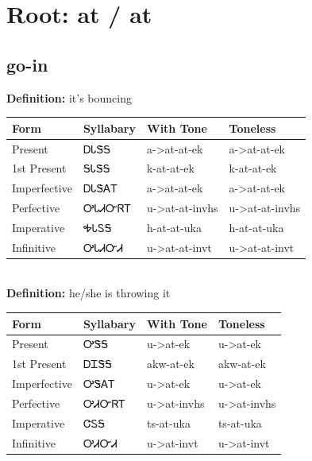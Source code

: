 \documentclass{article}%
\begin{document}
%
\normalsize%
\section*{Root: at / at}%
\subsection*{go-in}%
\textbf{Definition: }%
it’s bouncing%
\\[0.5em]%
\begin{tabular}{|l|l|l|l|}%
\hline%
\textbf{Form}&\textbf{Syllabary}&\textbf{With Tone}&\textbf{Toneless}\\%
\hline%
Present&ᎠᏓᏕᎦ&a{-}>at{-}at{-}ek&a{-}>at{-}at{-}ek\\%
1st Present&ᎦᏓᏕᎦ&k{-}at{-}at{-}ek&k{-}at{-}at{-}ek\\%
Imperfective&ᎠᏓᏕᎪᎢ&a{-}>at{-}at{-}ek&a{-}>at{-}at{-}ek\\%
Perfective&ᎤᏓᏗᏅᏒᎢ&u{-}>at{-}at{-}invhs&u{-}>at{-}at{-}invhs\\%
Imperative&ᎭᏓᏚᎦ&h{-}at{-}at{-}uka&h{-}at{-}at{-}uka\\%
Infinitive&ᎤᏓᏗᏅᏗ&u{-}>at{-}at{-}invt&u{-}>at{-}at{-}invt\\%
\hline%
\end{tabular}%
\\[1em]%
\textbf{Definition: }%
he/she is throwing it%
\\[0.5em]%
\begin{tabular}{|l|l|l|l|}%
\hline%
\textbf{Form}&\textbf{Syllabary}&\textbf{With Tone}&\textbf{Toneless}\\%
\hline%
Present&ᎤᏕᎦ&u{-}>at{-}ek&u{-}>at{-}ek\\%
1st Present&ᎠᏆᏕᎦ&akw{-}at{-}ek&akw{-}at{-}ek\\%
Imperfective&ᎤᏕᎪᎢ&u{-}>at{-}ek&u{-}>at{-}ek\\%
Perfective&ᎤᏗᏅᏒᎢ&u{-}>at{-}invhs&u{-}>at{-}invhs\\%
Imperative&ᏣᏚᎦ&ts{-}at{-}uka&ts{-}at{-}uka\\%
Infinitive&ᎤᏗᏅᏗ&u{-}>at{-}invt&u{-}>at{-}invt\\%
\hline%
\end{tabular}%
\\[1em]%
\end{document}

